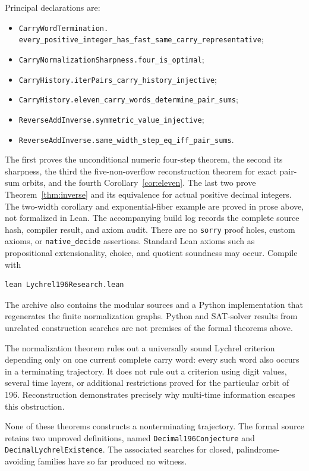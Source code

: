 \documentclass[11pt]{article}
\begin{document}
Principal declarations are:
\begin{itemize}
\item \texttt{CarryWordTermination.}\\
\texttt{every\_positive\_integer\_has\_fast\_same\_carry\_representative};
\item \texttt{CarryNormalizationSharpness.four\_is\_optimal};
\item \texttt{CarryHistory.iterPairs\_carry\_history\_injective};
\item \texttt{CarryHistory.eleven\_carry\_words\_determine\_pair\_sums};
\item \texttt{ReverseAddInverse.symmetric\_value\_injective};
\item \texttt{ReverseAddInverse.same\_width\_step\_eq\_iff\_pair\_sums}.
\end{itemize}
The first proves the unconditional numeric four-step theorem, the second its
sharpness, the third the five-non-overflow reconstruction theorem for
exact pair-sum orbits, and the fourth Corollary~\ref{cor:eleven}.
The last two prove Theorem~\ref{thm:inverse} and its equivalence for actual
positive decimal integers. The two-width corollary and exponential-fiber
example are proved in prose above, not formalized in Lean.
The accompanying build log records the complete
source hash, compiler result, and axiom audit. There are no \texttt{sorry}
proof holes, custom axioms, or \texttt{native\_decide} assertions. Standard
Lean axioms such as propositional extensionality, choice, and quotient
soundness may occur. Compile with
\begin{verbatim}
lean Lychrel196Research.lean
\end{verbatim}
The archive also contains the modular sources and a Python implementation
that regenerates the finite normalization graphs. Python and SAT-solver
results from unrelated construction searches are not premises of the
formal theorems above.

The normalization theorem rules out a universally sound Lychrel criterion
depending only on one current complete carry word: every such word also
occurs in a terminating trajectory. It does not rule out a criterion using
digit values, several time layers, or additional restrictions proved for
the particular orbit of 196. Reconstruction demonstrates precisely why
multi-time information escapes this obstruction.

None of these theorems constructs a nonterminating trajectory. The formal source
retains two unproved definitions, named \texttt{Decimal196Conjecture}
and \texttt{DecimalLychrelExistence}. The associated searches for
closed, palindrome-avoiding families have so far produced no witness.
\end{document}
